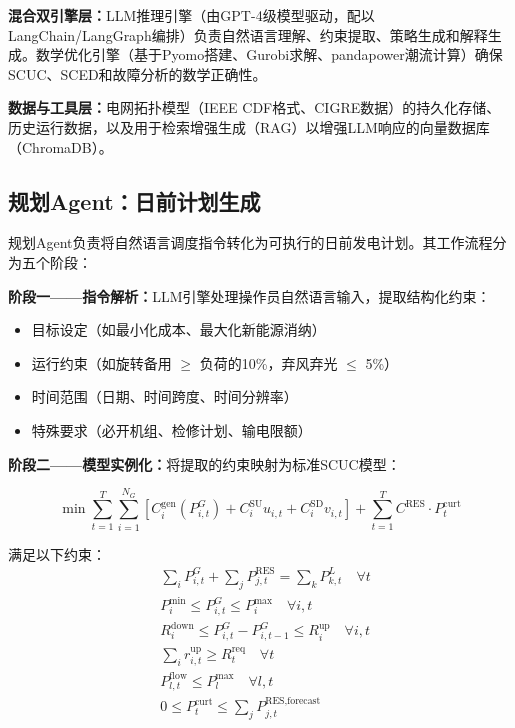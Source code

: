 \documentclass[conference]{IEEEtran}
\begin{document}
\textbf{混合双引擎层：}LLM推理引擎（由GPT-4级模型驱动，配以LangChain/LangGraph编排）负责自然语言理解、约束提取、策略生成和解释生成。数学优化引擎（基于Pyomo搭建、Gurobi求解、pandapower潮流计算）确保SCUC、SCED和故障分析的数学正确性。

\textbf{数据与工具层：}电网拓扑模型（IEEE CDF格式、CIGRE数据）的持久化存储、历史运行数据，以及用于检索增强生成（RAG）以增强LLM响应的向量数据库（ChromaDB）。

\subsection{规划Agent：日前计划生成}

规划Agent负责将自然语言调度指令转化为可执行的日前发电计划。其工作流程分为五个阶段：

\textbf{阶段一——指令解析：}LLM引擎处理操作员自然语言输入，提取结构化约束：
\begin{itemize}
    \item 目标设定（如最小化成本、最大化新能源消纳）
    \item 运行约束（如旋转备用 $\geq$ 负荷的10\%，弃风弃光 $\leq$ 5\%）
    \item 时间范围（日期、时间跨度、时间分辨率）
    \item 特殊要求（必开机组、检修计划、输电限额）
\end{itemize}

\textbf{阶段二——模型实例化：}将提取的约束映射为标准SCUC模型：

\begin{equation}
\min \sum_{t=1}^{T} \sum_{i=1}^{N_G} \left[ C_i^{\text{gen}}(P_{i,t}^G) + C_i^{\text{SU}} u_{i,t} + C_i^{\text{SD}} v_{i,t} \right] + \sum_{t=1}^{T} C^{\text{RES}} \cdot P_t^{\text{curt}}
\label{eq:scuc_obj}
\end{equation}

满足以下约束：
\begin{align}
&\sum_{i} P_{i,t}^G + \sum_{j} P_{j,t}^{\text{RES}} = \sum_{k} P_{k,t}^L \quad \forall t \label{eq:p_bal}\\
&P_i^{\min} \leq P_{i,t}^G \leq P_i^{\max} \quad \forall i,t \label{eq:gen_limit}\\
&R_i^{\text{down}} \leq P_{i,t}^G - P_{i,t-1}^G \leq R_i^{\text{up}} \quad \forall i,t \label{eq:ramp}\\
&\sum_{i} r_{i,t}^{\text{up}} \geq R_t^{\text{req}} \quad \forall t \label{eq:reserve}\\
&P_{l,t}^{\text{flow}} \leq P_l^{\max} \quad \forall l,t \label{eq:line_flow}\\
&0 \leq P_t^{\text{curt}} \leq \sum_j P_{j,t}^{\text{RES},\text{forecast}} \label{eq:curtailment}
\end{align}
\end{document}
